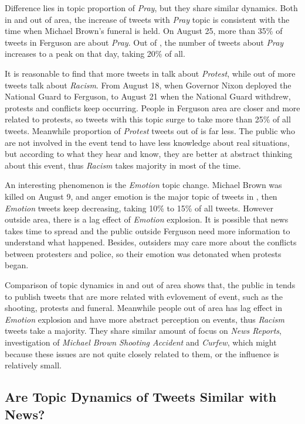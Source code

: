 Difference lies in topic proportion of \emph{Pray}, but they share similar dynamics. Both in and out of \stlouis area, the increase of tweets with \emph{Pray} topic is consistent with the time when Michael Brown's funeral is held. On August 25, more than 35\% of tweets in Ferguson are about \emph{Pray}. Out of \stlouis, the number of tweets about \emph{Pray} increases to a peak on that day, taking 20\% of all.

It is reasonable to find that more tweets in \stlouis talk about \emph{Protest}, while out of \stlouis more tweets talk about \emph{Racism}. From August 18, when Governor Nixon deployed the National Guard to Ferguson, to August 21 when the National Guard withdrew, protests and conflicts keep occurring. People in Ferguson area are closer and more related to protests, so tweets with this topic surge to take more than 25\% of all tweets. Meanwhile proportion of \emph{Protest} tweets out of \stlouis is far less. The public who are not involved in the event tend to have less knowledge about real situations, but according to what they hear and know, they are better at abstract thinking about this event, thus \emph{Racism} takes majority in most of the time.

An interesting phenomenon is the \emph{Emotion} topic change. Michael Brown was killed on August 9, and anger emotion is the major topic of tweets in \stlouis, then \emph{Emotion} tweets keep decreasing, taking 10\% to 15\% of all tweets. However outside \stlouis area, there is a lag effect of \emph{Emotion} explosion. It is possible that news takes time to spread and the public outside Ferguson need more information to understand what happened. Besides, outsiders may care more about the conflicts between protesters and police, so their emotion was detonated when protests began.

Comparison of topic dynamics in and out of \stlouis area shows that, the public in \stlouis tends to publish tweets that are more related with evlovement of event, such as the shooting, protests and funeral. Meanwhile people out of \stlouis area has lag effect in \emph{Emotion} explosion and have more abstract perception on events, thus \emph{Racism} tweets take a majority. They share similar amount of focus on \emph{News Reports}, investigation of \emph{Michael Brown Shooting Accident} and \emph{Curfew}, which might because these issues are not quite closely related to them, or the influence is relatively small.

\subsection{Are Topic Dynamics of Tweets Similar with News?}

